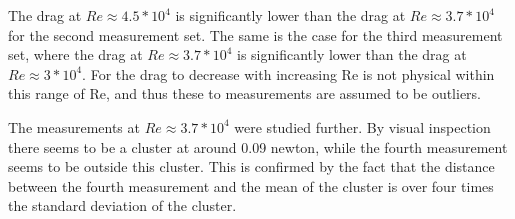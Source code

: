 The drag at $Re \approx 4.5*10^4$ is significantly lower than the drag at $Re \approx 3.7*10^4$ for the second measurement set. The same is the case for the third measurement set, where the drag at $Re \approx 3.7*10^4$ is significantly lower than the drag at $Re \approx 3*10^4$. For the drag to decrease with increasing Re is not physical within this range of Re, and thus these to measurements are assumed to be outliers. 

The measurements at $Re \approx 3.7*10^4$ were studied further. By visual inspection there seems to be a cluster at around 0.09 \si{newton}, while the fourth measurement seems to be outside this cluster. This is confirmed by the fact that the distance between the fourth measurement and the mean of the cluster is over four times the standard deviation of the cluster. 





